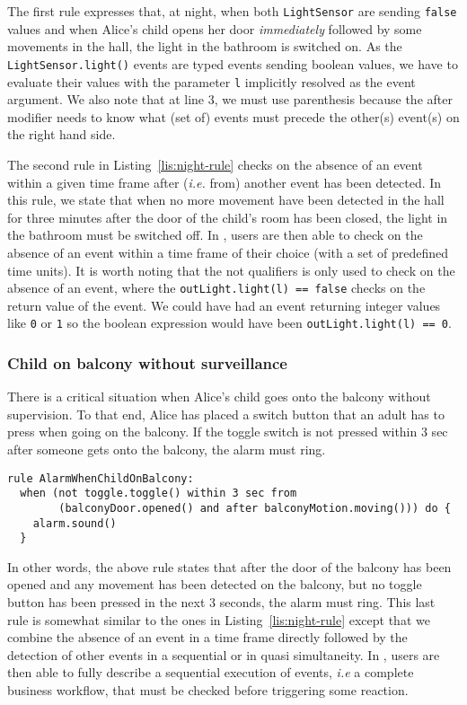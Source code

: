 The first rule expresses that, at night, when both \texttt{LightSensor} are sending \texttt{false} values and when Alice's child opens her door \textit{immediately} followed by some movements in the hall, the light in the bathroom is switched on. As the \texttt{LightSensor.light()} events are typed events sending boolean values, we have to evaluate their values with the parameter \texttt{l} implicitly resolved as the event argument. We also note that at line 3, we must use parenthesis because the \textsf{after} modifier needs to know what (set of) events must precede the other(s) event(s) on the right hand side. 

The second rule in Listing~\ref{lis:night-rule} checks on the absence of an event \textsf{within} a given time frame after (\textit{i.e.} \textsf{from}) another event has been detected. In this rule, we state that when no more movement have been detected in the hall for three minutes after the door of the child's room has been closed, the light in the bathroom must be switched off. In \IOTDSL, users are then able to check on the absence of an event within a time frame of their choice (with a set of predefined time units). It is worth noting that the \textsf{not} qualifiers is only used to check on the absence of an event, where the \texttt{outLight.light(l) == false} checks on the return value of the event. We could have had an event returning \textsf{integer} values like \texttt{0} or \texttt{1} so the boolean expression would have been \texttt{outLight.light(l) == 0}.

\subsubsection*{Child on balcony without surveillance}
	
There is a critical situation when Alice's child goes onto the balcony without supervision. To that end, Alice has placed a switch button that an adult has to press when going on the balcony. If the toggle switch is not pressed within 3 sec after someone gets onto the balcony, the alarm must ring.

\begin{lstlisting}[language=iotdsl,label=lis:balcony-rule,caption=\IOTDSL business rules ring the alarm when Alice's child alone on balcony]
rule AlarmWhenChildOnBalcony:	
  when (not toggle.toggle() within 3 sec from 
  		(balconyDoor.opened() and after balconyMotion.moving())) do {
    alarm.sound()
  }
\end{lstlisting}

In other words, the above rule states that after the door of the balcony has been opened and any movement has been detected on the balcony, but no toggle button has been pressed in the next 3 seconds, the alarm must ring. This last rule is somewhat similar to the ones in Listing~\ref{lis:night-rule} except that we combine the absence of an event in a time frame directly followed by the detection of other events in a sequential or in quasi simultaneity. In \IOTDSL, users are then able to fully describe a sequential execution of events, \textit{i.e} a complete business workflow, that must be checked before triggering some \textsf{reaction}.


